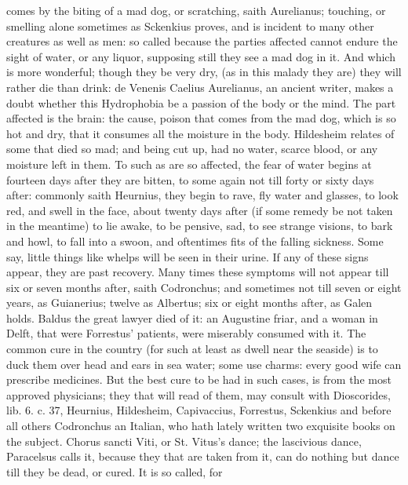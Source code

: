 {comes by the biting of a mad dog, or scratching, saith Aurelianus;
touching, or smelling alone sometimes as Sckenkius proves, and is
incident to many other creatures as well as men: so called because the
parties affected cannot endure the sight of water, or any liquor,
supposing still they see a mad dog in it. And which is more wonderful;
though they be very dry, (as in this malady they are) they will rather
die than drink: de Venenis Caelius Aurelianus, an ancient writer,
makes a doubt whether this Hydrophobia be a passion of the body or the
mind. The part affected is the brain: the cause, poison that comes from
the mad dog, which is so hot and dry, that it consumes all the moisture
in the body.  Hildesheim relates of some that died so mad; and
being cut up, had no water, scarce blood, or any moisture left in them.
To such as are so affected, the fear of water begins at fourteen days
after they are bitten, to some again not till forty or sixty days
after: commonly saith Heurnius, they begin to rave, fly water and
glasses, to look red, and swell in the face, about twenty days after
(if some remedy be not taken in the meantime) to lie awake, to be
pensive, sad, to see strange visions, to bark and howl, to fall into a
swoon, and oftentimes fits of the falling sickness.  Some say,
little things like whelps will be seen in their urine. If any of these
signs appear, they are past recovery. Many times these symptoms will
not appear till six or seven months after, saith Codronchus; and
sometimes not till seven or eight years, as Guianerius; twelve as
Albertus; six or eight months after, as Galen holds. Baldus the great
lawyer died of it: an Augustine friar, and a woman in Delft, that were
Forrestus' patients, were miserably consumed with it. The common
cure in the country (for such at least as dwell near the seaside) is to
duck them over head and ears in sea water; some use charms: every good
wife can prescribe medicines. But the best cure to be had in such
cases, is from the most approved physicians; they that will read of
them, may consult with Dioscorides, lib. 6. c. 37, Heurnius,
Hildesheim, Capivaccius, Forrestus, Sckenkius and before all others
Codronchus an Italian, who hath lately written two exquisite books on
the subject.
Chorus sancti Viti, or St. Vitus's dance; the lascivious dance, 
Paracelsus calls it, because they that are taken from it, can do
nothing but dance till they be dead, or cured. It is so called, for
}
